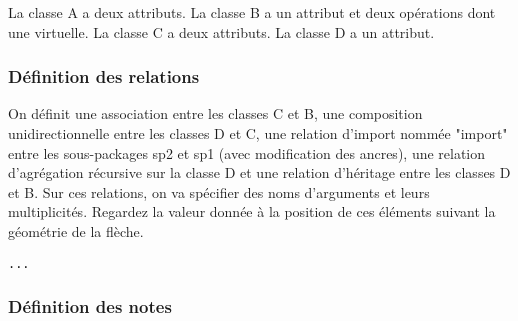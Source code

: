 \documentclass[a4paper,11pt]{report}
\newcommand{\inputTikZ}[1]{%
  }%
\newcommand{\inputTikZ}[1]{%
    \texttt{[image: fig/\#1.pdf]}%
  }%
\begin{document}
La classe A a deux attributs. La classe B a un attribut et deux opérations dont une virtuelle. La classe C a deux attributs. La classe D a un attribut.

\vspace{-0.4cm}
{\color{red!70!black}
\vspace{-0.4cm}
}
\vspace{-0.4cm}
{\color{red!70!black}
\vspace{-0.4cm}
}
\vspace{-0.4cm}
{\color{red!70!black}
\vspace{-0.4cm}
}


\begin{center}
\inputTikZ{classdiagstep2}
\end{center}


\subsubsection{Définition des relations}

On définit une association entre les classes C et B, une composition unidirectionnelle entre les classes D et C, une relation d'import nommée "import" entre les sous-packages sp2 et sp1 (avec modification des ancres), une relation d'agrégation récursive sur la classe D et une relation d'héritage entre les classes D et B. Sur ces relations, on va spécifier des noms d'arguments et leurs multiplicités. Regardez la valeur donnée à la position de ces éléments suivant la géométrie de la flèche.

\medskip

\hspace{-0.7cm}\lstinline{...}
{\color{red!70!black}

}

\begin{center}
\inputTikZ{classdiagstep3}
\end{center}

\subsubsection{Définition des notes}
\end{document}
